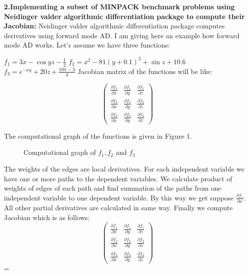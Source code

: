 \documentclass[paper=letter, fontsize=12pt]{scrartcl} %
\begin{document}
\Large \textbf{2.Implementing a subset of MINPACK benchmark problems using Neidinger valder algorithmic
differentiation package to compute their Jacobian:}
\normalsize
\newline
Neidinger valder algorithmic differentiation package computes derivatives using forward mode AD. I am giving here an example how forward mode AD works. Let's assume we have three functions: 
\begin{enumerate} [align=left,style=nextline,leftmargin=1.5cm,labelsep=\parindent,font=\normalfont]
$f_1 = 3x - \cos yz - \frac{1}{2}$\newline
$f_2 = x^2 - 81(y+0.1)^2 + \sin z + 10.6$ \newline
$f_3 = e^{-xy} + 20z + \frac{10\pi - 3}{3}$\newline
\newline
Jacobian matrix of the functions will be like: 

\[ \left( \begin{array}{ccc}
\frac{\partial f_1}{\partial x} & \frac{\partial f_1}{\partial y} & \frac{\partial f_1}{\partial z} \\
\frac{\partial f_2}{\partial x} & \frac{\partial f_2}{\partial y} & \frac{\partial f_2}{\partial z} \\
\frac{\partial f_3}{\partial x} & \frac{\partial f_3}{\partial y} & \frac{\partial f_3}{\partial z} \end{array} \right)\] 
\end{enumerate}
\newline
The computational graph of the functions is given in Figure 1.\\
\begin{figure}[!]
\begin{center}
\resizebox{1.1\textwidth}{!}{
}
\caption{Computational graph of $f_1, f_2$  and  $f_3$}

\end{center}
\end{figure}
The weights of the edges are local derivatives. For each independent variable we have one or more paths to the dependent variables. We calculate product of weights of edges of each path and find summation of the paths from one independent variable to one dependent variable. By this way we get suppose  $ \frac{\partial f_1}{\partial x}$. All other partial derivatives are calculated in same way. Finally we compute Jacobian which is as follows: \\
\[ \left( \begin{array}{ccc}
\frac{\partial f_1}{\partial x} & \frac{\partial f_1}{\partial y} & \frac{\partial f_1}{\partial z} \\
\frac{\partial f_2}{\partial x} & \frac{\partial f_2}{\partial y} & \frac{\partial f_2}{\partial z} \\
\frac{\partial f_3}{\partial x} & \frac{\partial f_3}{\partial y} & \frac{\partial f_3}{\partial z} \end{array} \right)\] = 
\end{document}
